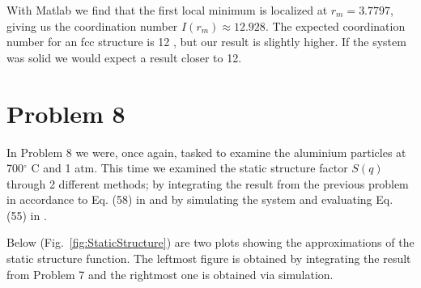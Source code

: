 With Matlab we find that the first local minimum is localized at $r_m = 3.7797$, giving us the coordination number $I(r_m) \approx 12.928$. The expected coordination number for an fcc structure is 12 \cite{al_coordination_nbr}, but our result is slightly higher. If the system was solid we would expect a result closer to 12.

\section*{Problem 8}

In Problem 8 we were, once again, tasked to examine the aluminium particles at 700$^\circ$ C and 1 atm. This time we examined the static structure factor $S(q)$ through 2 different methods; by integrating the result from the previous problem in accordance to Eq. (58) in \cite{lecnotes} and by simulating the system and evaluating Eq. (55) in \cite{lecnotes}.

Below (Fig.~\ref{fig:StaticStructure}) are two plots showing the approximations of the static structure function. The leftmost figure is obtained by integrating the result from Problem 7 and the rightmost one is obtained via simulation. 

